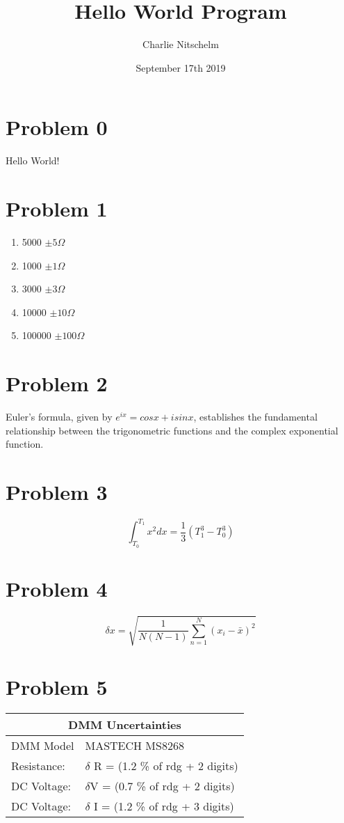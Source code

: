 \documentclass[12pt]{article}
\title{Hello World Program}
\author{Charlie Nitschelm}
\date{September 17th 2019}
\begin{document}
\maketitle

\section{Problem 0}
Hello World!

\section{Problem 1}
\newcommand{\rpm}{\raisebox{.2ex}{$\scriptstyle\pm$}}
\begin{enumerate}
\item 5000 $\pm 5\Omega$
\item 1000 $\pm 1\Omega$
\item 3000 $\pm 3\Omega$
\item 10000 $\pm 10\Omega$
\item 100000 $\pm 100\Omega$
	
\end{enumerate}

\section{Problem 2}
Euler's formula, given by $ e^{ix} = cos x + i sin x$,  establishes the fundamental relationship between the trigonometric functions and the complex exponential function.


\section{Problem 3}

$$\int_{T_0}^{T_1} x^2 dx = \frac{1}{3} (T_1^3 - T_0^3)$$



\section{Problem 4}

$$    \delta x      =  \sqrt{\frac{1}{N(N-1)}\sum_{n=1}^{N} (x_i - \bar{x})^2} $$


\section{Problem 5}

\begin{tabular}{ |l|l| }
  \hline
  \multicolumn{2}{|c|}{DMM Uncertainties} \\
  \hline
  DMM Model & MASTECH MS8268 \\
  Resistance: &   $\delta$ R = (1.2 \% of rdg + 2 digits) \\
  DC Voltage: & $\delta$V = (0.7 \% of rdg + 2 digits) \\
  DC Voltage: &$\delta$ I = (1.2 \% of rdg + 3 digits) \\
  \hline
\end{tabular}
\end{document}

